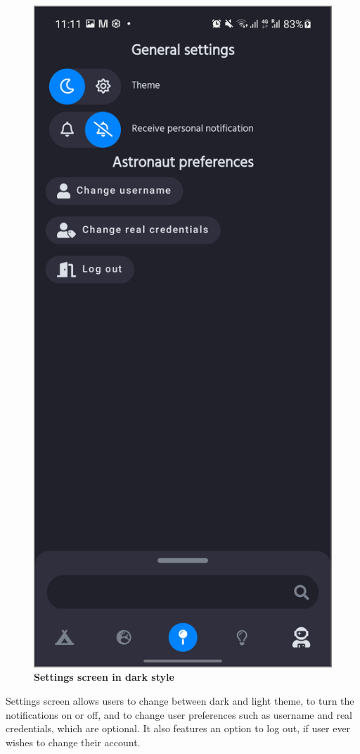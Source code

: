 \begin{figure}[!htb]
\begin{minipage}{.48\textwidth}
\centering
\includegraphics[width=.9\textwidth]{../Images/UI/SettingsDark.jpg}
\caption{\label{fig:dbapiuser}\textbf{Settings screen in dark style}}
\end{minipage}
\end{figure}

Settings screen allows users to change between dark and light theme, to turn the notifications on or off, and to change user preferences such as username and real credentials, which are optional. It also features an option to log out, if user ever wishes to change their account. 
 
\newpage
